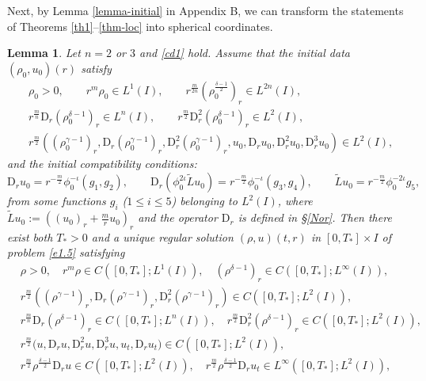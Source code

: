 \documentclass[11pt,reqno]{amsart}
\newtheorem{lem}{Lemma}[section]
\numberwithin{rk}{section}
\numberwithin{prop}{section}
\numberwithin{mydef}{section}
\numberwithin{lem}{section}
\numberwithin{equation}{section}
\numberwithin{thm}{section}
\begin{document}
Next, by Lemma  \ref{lemma-initial} in Appendix B, we can transform the statements of Theorems \ref{th1}--\ref{thm-loc} into spherical coordinates.
\begin{lem}\label{rth1} Let $n=2$ or $3$ and \eqref{cd1} hold. Assume that the initial data $(\rho_0, u_0)(r)$ satisfy 
\begin{equation}\label{etm}
\begin{aligned}
&\rho_0>0,\qquad r^m\rho_0\in L^1(I),\qquad r^\frac{m}{2n}(\rho_0^\frac{\delta-1}{2})_r\in L^{2n}(I),\\[2pt]
&r^{\frac{m}{n}} \mathrm{D}_r(\rho_0^{\delta-1})_{r} \in L^n(I),\qquad r^{\frac{m}{2}}  \mathrm{D}_r^2(\rho_0^{\delta-1})_{r} \in L^2(I),\\[4pt]
&r^{\frac{m}{2}} ((\rho_0^{\gamma-1})_r,\mathrm{D}_r(\rho_0^{\gamma-1})_{r},\mathrm{D}_r^2(\rho_0^{\gamma-1})_{r},u_0,\mathrm{D}_ru_0,\mathrm{D}_r^2u_0,\mathrm{D}_r^3u_0)\in L^2(I),
\end{aligned}
\end{equation}
and the initial  compatibility conditions{\rm :}
\begin{equation}\label{xiangrongxing}
\mathrm{D}_r u_0=r^{-\frac{m}{2}}\phi^{-\iota}_0(g_1 ,g_2),\qquad \mathrm{D}_r(\phi^{2\iota}_0 \tilde Lu_0)=r^{-\frac{m}{2}}\phi^{-\iota}_0(g_3,g_4),\qquad \tilde Lu_0=r^{-\frac{m}{2}} \phi^{-2\iota}_0g_5,
\end{equation}
from some functions $g_i$ {\rm(}$1\leq i\leq 5${\rm)} belonging to $L^2(I)$, where $\tilde Lu_0:=((u_0)_r+\frac{m}{r}u_0)_r$ and the operator $\mathrm{D}_r$ is defined in {\rm\S\ref{Nor}}. Then there exist both $T_*>0$ and a unique regular solution $(\rho, u)(t,r)$ in $[0,T_*]\times I$ of problem \eqref{e1.5}  satisfying 
\begin{equation}\label{spd}
\begin{aligned}
&\rho>0,\quad r^m\rho \in C([0,T_*];L^1(I)),\quad (\rho^{\delta-1})_{r}\in C([0,T_*];L^\infty(I)),\\
&r^{\frac{m}{2}}((\rho^{\gamma-1})_r,\mathrm{D}_r(\rho^{\gamma-1})_r, \mathrm{D}_r^2(\rho^{\gamma-1})_r)\in C([0,T_*];L^2(I)),\\
&r^{\frac{m}{n}} \mathrm{D}_r(\rho^{\delta-1})_{r}\in C([0,T_*];L^n(I)), \quad  r^{\frac{m}{2}} \mathrm{D}_r^2(\rho^{\delta-1})_{r}\in C([0,T_*];L^2(I)),\\
&r^{\frac{m}{2}}\big(u,\mathrm{D}_ru, \mathrm{D}_r^2u, \mathrm{D}_r^3u,u_t,\mathrm{D}_ru_t\big)\in C([0,T_*];L^2(I)),\\
&r^{\frac{m}{2}}\rho^\frac{\delta-1}{2}\mathrm{D}_ru\in C([0,T_*];L^2(I)),\quad  r^{\frac{m}{2}}\rho^\frac{\delta-1}{2} \mathrm{D}_ru_t\in L^\infty([0,T_*];L^2(I)),\\

\end{aligned}
\end{equation}
\end{lem}
\end{document}
